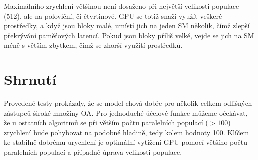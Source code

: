 Maximálního zrychlení většinou není dosaženo při největší velikosti populace (512), ale na poloviční, či čtvrtinové. GPU se totiž snaží využít veškeré prostředky, a když jsou bloky malé, umístí jich na jeden SM několik, čímž zlepší překrývání paměťových latencí. Pokud jsou bloky příliš velké, vejde se jich na SM méně s větším \bq zbytkem\eq , čímž se zhorší využití prostředků.

\section{Shrnutí}

Provedené testy prokázaly, že se model chová dobře pro několik celkem odlišných zástupců široké množiny OA. Pro jednoduché účelové funkce můžeme očekávat, že u ostatních algoritmů se při větším počtu paralelních populací ($>100$) zrychlení bude pohybovat na podobné hladině, tedy kolem hodnoty 100. Klíčem ke stabilně dobrému urychlení je optimální vytížení GPU pomocí většího počtu paralelních populací a případně úprava velikosti populace.

